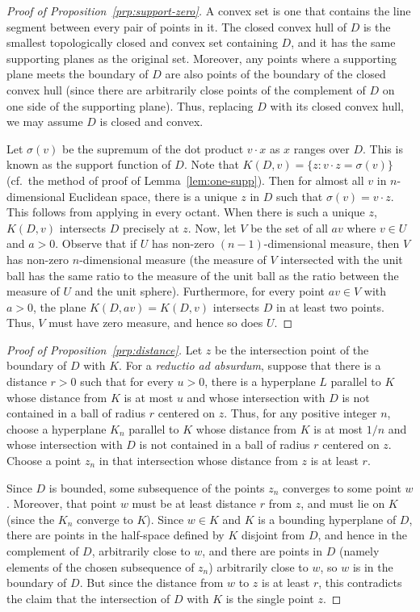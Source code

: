\begin{proof}[Proof of Proposition~\ref{prp:support-zero}]
A convex set is one that contains the line segment between every pair of points in it. The closed convex hull of $D$ is the smallest topologically closed and convex set containing $D$, and it has the same supporting planes as the original set. Moreover, any points where a supporting plane meets the boundary of $D$ are also points of the boundary of the closed convex hull (since there are arbitrarily close points of the complement of $D$ on one side of the supporting plane). Thus, replacing $D$ with its closed convex hull, we may assume $D$ is closed and convex.

Let $\sigma(v)$ be the supremum of the dot product $v\cdot x$ as $x$ ranges over $D$. This is known as the support function of $D$. Note that $K(D,v) = \{ z : v\cdot z = \sigma(v) \}$ (cf.\ the method of proof of Lemma~\ref{lem:one-supp}). Then for almost all $v$ in $n$-dimensional Euclidean space, there is a unique $z$ in $D$ such that $\sigma(v) = v\cdot z$. This follows from applying  in every octant.
When there is such a unique $z$, $K(D,v)$ intersects $D$ precisely at $z$. Now, let $V$ be the set of all $av$ where $v\in U$ and $a>0$. Observe that if $U$ has non-zero $(n-1)$-dimensional measure, then $V$ has non-zero $n$-dimensional measure (the measure of $V$ intersected with the unit ball has the same ratio to the measure of the unit ball as the ratio between the measure of $U$ and the unit sphere). Furthermore, for every point $av\in V$ with $a>0$, the plane $K(D,av)=K(D,v)$ intersects $D$ in at least two points. Thus, $V$ must have zero measure, and hence so does $U$.
\end{proof}

\begin{proof}[Proof of Proposition~\ref{prp:distance}]
Let $z$ be the intersection point of the boundary of $D$ with $K$. For a \textit{reductio ad absurdum}, suppose that there is a distance $r>0$ such that for every $u>0$, there is a hyperplane $L$ parallel to $K$ whose distance from $K$ is at most $u$ and whose intersection with $D$ is not contained in a ball of radius $r$ centered on $z$. Thus, for any positive integer $n$, choose a hyperplane $K_n$ parallel to $K$ whose distance from $K$ is at most $1/n$ and whose intersection with $D$ is not contained in a ball of radius $r$ centered on $z$. Choose a point $z_n$ in that intersection whose distance from $z$ is at least $r$. 

Since $D$ is bounded, some subsequence of the points $z_n$ converges to some point $w$. Moreover, that point $w$ must be at least distance $r$ from $z$, and must lie on $K$ (since the $K_n$ converge to $K$). Since $w\in K$ and $K$ is a bounding hyperplane of $D$, there are points in the half-space defined by $K$ disjoint from $D$, and hence in the complement of $D$, arbitrarily close to $w$, and there are points in $D$ (namely elements of the chosen subsequence of $z_n$) arbitrarily close to $w$, so $w$ is in the boundary of $D$. But since the distance from $w$ to $z$ is at least $r$, this contradicts the claim that the intersection of $D$ with $K$ is the single point $z$.
\end{proof}


\chaptertail 


